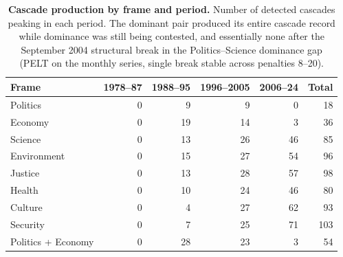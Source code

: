 \begin{table}[H]
\centering
\renewcommand{\arraystretch}{1.15}
\caption{\textbf{Cascade production by frame and period.} Number of
detected cascades peaking in each period. The dominant pair produced
its entire cascade record while dominance was still being contested,
and essentially none after the September 2004 structural break in the
Politics--Science dominance gap (PELT on the monthly series, single
break stable across penalties 8--20).}
\label{tab:si_production}
\vspace{0.3em}
\small
\begin{tabular}{@{}l r r r r r@{}}
\toprule
Frame & 1978--87 & 1988--95 & 1996--2005 & 2006--24 & Total \\
\midrule
Politics & 0 & 9 & 9 & 0 & 18 \\
Economy & 0 & 19 & 14 & 3 & 36 \\
Science & 0 & 13 & 26 & 46 & 85 \\
Environment & 0 & 15 & 27 & 54 & 96 \\
Justice & 0 & 13 & 28 & 57 & 98 \\
Health & 0 & 10 & 24 & 46 & 80 \\
Culture & 0 & 4 & 27 & 62 & 93 \\
Security & 0 & 7 & 25 & 71 & 103 \\
\midrule
Politics + Economy & 0 & 28 & 23 & 3 & 54 \\
\bottomrule
\end{tabular}
\end{table}
